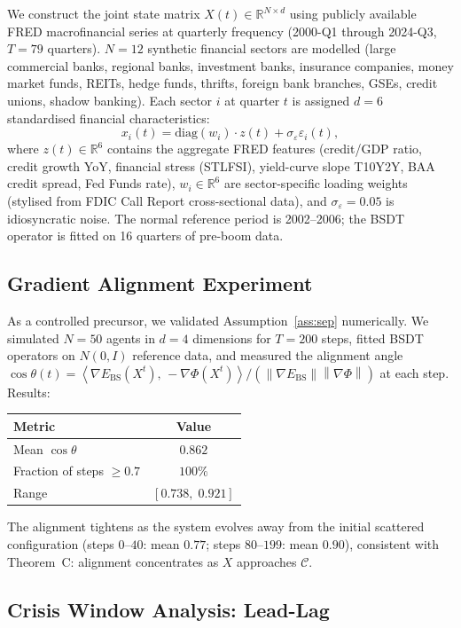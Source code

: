 \documentclass[11pt]{article}
\theoremstyle{definition}
\newcommand{\R}{\mathbb{R}}
\newcommand{\grad}{\nabla}
\newcommand{\Ebs}{E_{\mathrm{BS}}}
\newcommand{\Cman}{\mathcal{C}}
\newcommand{\norm}[1]{\left\|#1\right\|}
\newcommand{\inner}[2]{\left\langle #1,\, #2\right\rangle}
\newcommand{\costheta}{\cos\theta}
\begin{document}
We construct the joint state matrix $X(t) \in \R^{N \times d}$ using publicly
available FRED macrofinancial series at quarterly frequency (2000-Q1 through
2024-Q3, $T = 79$ quarters).  $N = 12$ synthetic financial sectors are modelled
(large commercial banks, regional banks, investment banks, insurance companies,
money market funds, REITs, hedge funds, thrifts, foreign bank branches, GSEs,
credit unions, shadow banking).  Each sector $i$ at quarter $t$ is assigned
$d = 6$ standardised financial characteristics:
\[
  x_i(t) = \mathrm{diag}(w_i) \cdot z(t) + \sigma_\varepsilon \varepsilon_i(t),
\]
where $z(t) \in \R^6$ contains the aggregate FRED features
(credit/GDP ratio, credit growth YoY, financial stress (STLFSI),
yield-curve slope T10Y2Y, BAA credit spread, Fed Funds rate),
$w_i \in \R^6$ are sector-specific loading weights (stylised from FDIC Call Report
cross-sectional data), and $\sigma_\varepsilon = 0.05$ is idiosyncratic noise.
The normal reference period is 2002--2006; the BSDT operator is fitted on 16
quarters of pre-boom data.

\subsection{Gradient Alignment Experiment}

As a controlled precursor, we validated Assumption~\ref{ass:sep}
numerically.  We simulated $N=50$ agents in $d=4$ dimensions for $T=200$ steps,
fitted BSDT operators on $N(0,I)$ reference data, and measured the alignment angle
$\costheta(t) = \inner{\grad\Ebs(X^t)}{-\grad\Phi(X^t)}/
(\norm{\grad\Ebs}\norm{\grad\Phi})$ at each step.  Results:
\begin{center}
\begin{tabular}{lc}
\toprule
Metric & Value \\
\midrule
Mean $\costheta$ & $0.862$ \\
Fraction of steps $\ge 0.7$ & $100\%$ \\
Range & $[0.738,\; 0.921]$ \\
\bottomrule
\end{tabular}
\end{center}
The alignment tightens as the system evolves away from the initial scattered
configuration (steps $0$--$40$: mean $0.77$; steps $80$--$199$: mean $0.90$),
consistent with Theorem~C: alignment concentrates as $X$ approaches $\Cman$.

\subsection{Crisis Window Analysis: Lead-Lag}
\end{document}
